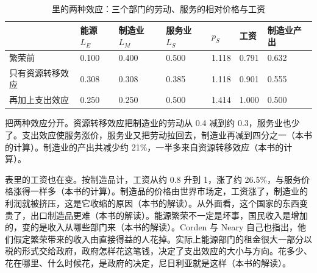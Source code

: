 \begin{table}[tbp]\centering\small
\caption{里的两种效应：三个部门的劳动、服务的相对价格与工资}\label{tab:oil-dutch}
\begin{tabularx}{\linewidth}{@{}lYYYYYY@{}}
\toprule
 & 能源 $L_E$ & 制造业 $L_M$ & 服务业 $L_S$ & $p_S$ & 工资 & 制造业产出\\
\midrule
繁荣前 & 0.100 & 0.400 & 0.500 & 1.118 & 0.791 & 0.632\\
只有资源转移效应 & 0.308 & 0.308 & 0.385 & 1.118 & 0.901 & 0.555\\
再加上支出效应 & 0.250 & 0.250 & 0.500 & 1.414 & 1.000 & 0.500\\
\bottomrule
\end{tabularx}
\end{table}

把两种效应分开。资源转移效应把制造业的劳动从 0.4 减到约 0.3，服务业也少了。支出效应使服务涨价，服务业又把劳动拉回去，制造业再减到四分之一（本书的计算）。制造业的产出共减少约 21\%，一半多来自资源转移效应（本书的计算）。

表里的工资也在变。按制造品计，工资从约 0.8 升到 1，涨了约 26.5\%，与服务价格涨得一样多（本书的计算）。制造品的价格由世界市场定，工资涨了，制造业的利润就被挤压，这是它收缩的原因（本书的解读）。从外面看，这个国家的东西变贵了，出口制造品更难（本书的解读）。能源繁荣不一定是坏事，国民收入是增加的，变的是收入从哪些部门来（本书的解读）。Corden 与 Neary 自己也指出，他们假定繁荣带来的收入由直接得益的人花掉\cite{cordenneary1982}。实际上能源部门的租金很大一部分以税的形式交给政府，政府怎样花这笔钱，决定了支出效应的大小与方向\cite{cordenneary1982}。花多少、花在哪里、什么时候花，是政府的决定，尼日利亚就是这样（本书的解读）。

